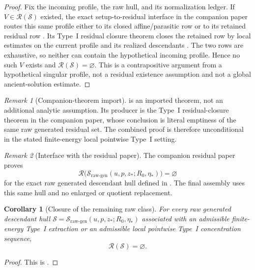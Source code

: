 \documentclass[11pt]{amsart}
\theoremstyle{plain}
\newtheorem{corollary}[corollary]{Corollary}
\theoremstyle{definition}
\theoremstyle{remark}
\newtheorem{remark}[remark]{Remark}
\numberwithin{equation}{section}
\newcommand{\calS}{\mathcal S}
\newcommand{\calR}{\mathcal R}
\begin{document}
\begin{proof}
Fix the incoming profile, the raw hull, and its normalization ledger.  If
\(V\in\calR(\calS)\) existed, the exact setup-to-residual interface in the
companion paper routes this same profile either to its closed affine/parasitic
row or to its retained residual row
\cite[Proposition~1.5]{BallesterResidual2026}.  Its Type~I residual closure
theorem closes the retained row by local estimates on the current profile and
its realized descendants \cite[Theorem~12.1]{BallesterResidual2026}.  The two
rows are exhaustive, so neither can contain the hypothetical incoming profile.
Hence no such \(V\) exists and \(\calR(\calS)=\varnothing\).  This is a
contrapositive argument from a hypothetical singular profile, not a residual
existence assumption and not a global ancient-solution estimate.
\end{proof}

\begin{remark}[Companion-theorem import]
\label{p1:rem:companion-paper}
 is an imported theorem, not an additional analytic
assumption.  Its producer is the Type~I residual-closure theorem in the
companion paper, whose conclusion is literal emptiness of the same raw
generated residual set.  The combined proof is therefore
unconditional in the stated finite-energy local pointwise Type~I setting.
\end{remark}

\begin{remark}[Interface with the residual paper]
\label{p1:rem:type-I-residual-interface}
The companion residual paper proves
\[
   \calR\bigl(
      \calS_{\mathrm{raw\text{-}gen}}(u,p,z_*;R_0,\eta_*)
   \bigr)=\varnothing
\]
for the exact raw generated descendant hull defined in
.  The final assembly uses this same
hull and no enlarged or quotient replacement.
\end{remark}

\begin{corollary}[Closure of the remaining raw class]
\label{p1:cor:remainder-rigidity}
For every raw generated descendant hull
\(\calS=\calS_{\mathrm{raw\text{-}gen}}(u,p,z_*;R_0,\eta_*)\) associated with an
admissible finite-energy Type~I extraction or an admissible local pointwise
Type~I concentration sequence,
\[
   \calR(\calS)=\varnothing .
\]
\end{corollary}

\begin{proof}
This is .
\end{proof}
\end{document}
